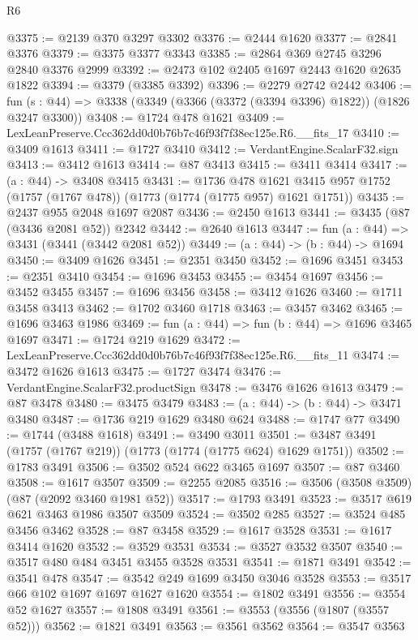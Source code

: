 \begin{lexlean}{R6}
\begin{coremodule}
@3375 := @2139 @370 @3297 @3302
@3376 := @2444 @1620
@3377 := @2841 @3376
@3379 := @3375 @3377 @3343
@3385 := @2864 @369 @2745 @3296 @2840 @3376 @2999
@3392 := @2473 @102 @2405 @1697 @2443 @1620 @2635 @1822
@3394 := @3379 (@3385 @3392)
@3396 := @2279 @2742 @2442
@3406 := fun (s : @44) => @3338 (@3349 (@3366 (@3372 (@3394 @3396) @1822)) (@1826 @3247 @3300))
@3408 := @1724 @478 @1621
@3409 := LexLeanPreserve.Ccc362dd0d0b76b7c46f93f7f38ec125e.R6.__fits_17
@3410 := @3409 @1613
@3411 := @1727 @3410
@3412 := VerdantEngine.ScalarF32.sign
@3413 := @3412 @1613
@3414 := @87 @3413
@3415 := @3411 @3414
@3417 := (a : @44) -> @3408 @3415
@3431 := @1736
    @478
    @1621
    @3415
    @957
    @1752
    (@1757 (@1767 @478))
    (@1773 (@1774 (@1775 @957) @1621 @1751))
@3435 := @2437 @955 @2048 @1697 @2087
@3436 := @2450 @1613
@3441 := @3435 (@87 (@3436 @2081 @52)) @2342
@3442 := @2640 @1613
@3447 := fun (a : @44) => @3431 (@3441 (@3442 @2081 @52))
@3449 := (a : @44) -> (b : @44) -> @1694
@3450 := @3409 @1626
@3451 := @2351 @3450
@3452 := @1696 @3451
@3453 := @2351 @3410
@3454 := @1696 @3453
@3455 := @3454 @1697
@3456 := @3452 @3455
@3457 := @1696 @3456
@3458 := @3412 @1626
@3460 := @1711 @3458 @3413
@3462 := @1702 @3460 @1718
@3463 := @3457 @3462
@3465 := @1696 @3463 @1986
@3469 := fun (a : @44) => fun (b : @44) => @1696 @3465 @1697
@3471 := @1724 @219 @1629
@3472 := LexLeanPreserve.Ccc362dd0d0b76b7c46f93f7f38ec125e.R6.__fits_11
@3474 := @3472 @1626 @1613
@3475 := @1727 @3474
@3476 := VerdantEngine.ScalarF32.productSign
@3478 := @3476 @1626 @1613
@3479 := @87 @3478
@3480 := @3475 @3479
@3483 := (a : @44) -> (b : @44) -> @3471 @3480
@3487 := @1736 @219 @1629 @3480 @624
@3488 := @1747 @77
@3490 := @1744 (@3488 @1618)
@3491 := @3490 @3011
@3501 := @3487 @3491 (@1757 (@1767 @219)) (@1773 (@1774 (@1775 @624) @1629 @1751))
@3502 := @1783 @3491
@3506 := @3502 @524 @622 @3465 @1697
@3507 := @87 @3460
@3508 := @1617 @3507
@3509 := @2255 @2085
@3516 := @3506 (@3508 @3509) (@87 (@2092 @3460 @1981 @52))
@3517 := @1793 @3491
@3523 := @3517 @619 @621 @3463 @1986 @3507 @3509
@3524 := @3502 @285
@3527 := @3524 @485 @3456 @3462
@3528 := @87 @3458
@3529 := @1617 @3528
@3531 := @1617 @3414 @1620
@3532 := @3529 @3531
@3534 := @3527 @3532 @3507
@3540 := @3517 @480 @484 @3451 @3455 @3528 @3531
@3541 := @1871 @3491
@3542 := @3541 @478
@3547 := @3542 @249 @1699 @3450 @3046 @3528
@3553 := @3517 @66 @102 @1697 @1697 @1627 @1620
@3554 := @1802 @3491
@3556 := @3554 @52 @1627
@3557 := @1808 @3491
@3561 := @3553 (@3556 (@1807 (@3557 @52)))
@3562 := @1821 @3491
@3563 := @3561 @3562
@3564 := @3547 @3563

\end{coremodule}
\end{lexlean}
